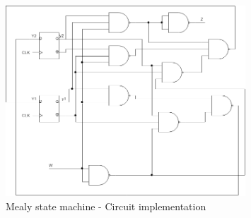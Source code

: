 \begin{figure}[H]
    \begin{centering}
    \includegraphics[width=0.8\textwidth]{Graficos2/2b_Compuertas_Mealy.png}
    \par\end{centering}
    \caption{Mealy state machine - Circuit implementation}
\end{figure}

